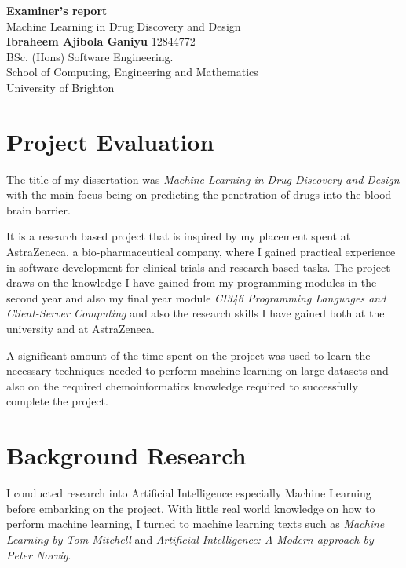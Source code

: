 \documentclass[a4paper,12pt]{article}
\begin{document}
\begin{titlepage}
	\begin{center}
		\huge
		\textbf{Examiner's report\\}
		\vspace{0.5cm}
		\Large
		Machine Learning in Drug Discovery and Design \\
		\vspace{1.5cm}
		\textbf{Ibraheem Ajibola Ganiyu}
		\vfill
		\textsc{12844772} \\
		BSc. (Hons) Software Engineering. \\
		\vspace{0.8cm}
		\large
		School of Computing, Engineering and Mathematics \\
		University of Brighton \\
		\date{\today}
	\end{center}
\end{titlepage}

\tableofcontents
\newpage
{}

\section{Project Evaluation}
	The title of my dissertation was \textit{Machine Learning in Drug Discovery and Design} with the main focus being on predicting the penetration of drugs into the blood brain barrier.
	
	It is a research based project that is inspired by my placement spent at AstraZeneca, a bio-pharmaceutical company, where I gained practical experience in software development for clinical trials and research based tasks. The project draws on the knowledge I have gained from my programming modules in the second year and also my final year module \textit{CI346 Programming Languages and Client-Server Computing} and also the research skills I have gained both at the university and at AstraZeneca.
	
	A significant amount of the time spent on the project was used to learn the necessary techniques needed to perform machine learning on large datasets and also on the required chemoinformatics knowledge required to successfully complete the project.
	
\section{Background Research}
	I conducted research into Artificial Intelligence especially Machine Learning before embarking on the project. With little real world knowledge on how to perform machine learning, I turned to machine learning texts such as \textit{Machine Learning by Tom Mitchell} and \textit{Artificial Intelligence: A Modern approach by Peter Norvig}. 
	
\end{document}
